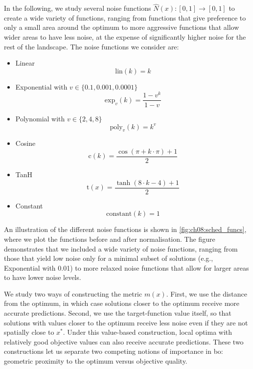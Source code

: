 In the following, we study several noise functions $\hat{N}(x):[0,1]\rightarrow[0,1]$ to create a wide variety of functions, ranging from functions that give preference to only a small area around the optimum to more aggressive functions that allow wider areas to have less noise, at the expense of significantly higher noise for the rest of the landscape. The noise functions we consider are:
\begin{itemize}
    \item Linear
    \begin{equation*}
        \text{lin}(k)=k
    \end{equation*}
    \item Exponential with $v\in\{0.1, 0.001, 0.0001\}$
    \begin{equation*}
        \text{exp}_v(k)=\frac{1-v^k}{1-v}
    \end{equation*}
    \item Polynomial with $v\in\{2,4,8\}$
    \begin{equation*}
        \text{poly}_v(k)=k^v
    \end{equation*}
    \item Cosine
    \begin{equation*}
        \text{c}(k)=\frac{\cos{(\pi + k \cdot \pi)} +1}{2}
    \end{equation*}
    \item TanH
    \begin{equation*}
        \text{t}(x)=\frac{\tanh{(8 \cdot k - 4)} + 1}{2}
    \end{equation*}
    \item Constant
    \begin{equation*}
        \text{constant}(k)=1
    \end{equation*}
\end{itemize}

An illustration of the different noise functions is shown in \cref{fig:ch08:sched_funcs}, where we plot the functions before and after normalisation. The figure demonstrates that we included a wide variety of noise functions, ranging from those that yield low noise only for a minimal subset of solutions (e.g., Exponential with 0.01) to more relaxed noise functions that allow for larger areas to have lower noise levels.

We study two ways of constructing the metric $m(x)$. First, we use the distance from the optimum, in which case solutions closer to the optimum receive more accurate predictions. Second, we use the target-function value itself, so that solutions with values closer to the optimum receive less noise even if they are not spatially close to $x^*$. Under this value-based construction, local optima with relatively good objective values can also receive accurate predictions.
These two constructions let us separate two competing notions of importance in \gls{bo}: geometric proximity to the optimum versus objective quality.

